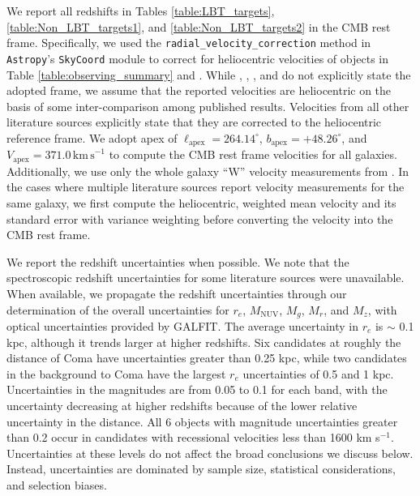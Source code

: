 \documentclass[twocolumn,tighten]{aastex63}
\begin{document}
We report all redshifts in Tables \ref{table:LBT_targets}, \ref{table:Non_LBT_targets1}, and \ref{table:Non_LBT_targets2} in the CMB rest frame. Specifically, we used the {\tt radial\_velocity\_correction} method in {\tt Astropy}'s {\tt SkyCoord} module to correct for heliocentric velocities of objects in Table \ref{table:observing_summary} and \cite{Kadowaki17}. While \cite{vanDokkum2015b}, \cite{Gu2018}, \cite{Ruiz18}, and \cite{Chilingarian2019} do not explicitly state the adopted frame, we assume that the reported velocities are heliocentric on the basis of some inter-comparison among published results. Velocities from all other literature sources explicitly state that they are corrected to the heliocentric reference frame.
We adopt apex of $\ell_\text{apex}=264.14^\circ$, $b_\text{apex}=+48.26^\circ$, and $V_\text{apex}=371.0 \, \mathrm{km \, s}^{-1}$ \citep{Fixsen1996}
to compute the CMB rest frame velocities for all galaxies. 
Additionally, we use only the whole galaxy ``W'' velocity measurements from \cite{Ruiz18}. In the cases where multiple literature sources report velocity measurements for the same galaxy, we first compute the heliocentric, weighted mean velocity and its standard error with variance weighting before converting the velocity into the CMB rest frame.

We report the redshift uncertainties when possible. We note that the spectroscopic redshift uncertainties for some literature sources were unavailable. When available, we propagate the redshift uncertainties through our determination of the overall uncertainties for $r_e$, $M_\text{NUV}$, $M_g$, $M_r$, and $M_z$, with optical uncertainties provided by GALFIT. The average uncertainty in $r_e$ is $\sim$ 0.1 kpc, although it trends larger at higher redshifts. Six candidates at roughly the distance of Coma have uncertainties greater than 0.25 kpc, while two candidates in the background to Coma have the largest $r_e$ uncertainties of 0.5 and 1 kpc. Uncertainties in the magnitudes are from 0.05 to 0.1 for each band, with the uncertainty decreasing at higher redshifts because of the lower relative uncertainty in the distance. All 6 objects with magnitude uncertainties greater than 0.2 occur in candidates with recessional velocities less than 1600 km s$^{-1}$. Uncertainties at these levels do not affect the broad conclusions we discuss below. Instead, uncertainties are dominated by sample size, statistical considerations, and selection biases.
\end{document}
